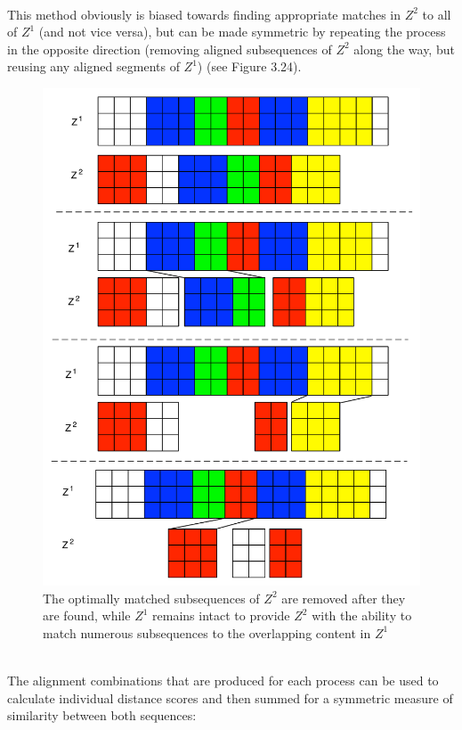 \documentclass[a4paper,12pt]{report} 	%
\numberwithin{figure}{chapter}
\numberwithin{table}{chapter}
\numberwithin{equation}{chapter}
\begin{document}
\begin{flushleft}
\begin{figure}[h!]
\end{figure}
\\
This method obviously is biased towards finding appropriate matches in $Z^2$ to all of $Z^1$ (and not vice versa), but can be made symmetric by repeating the process in the opposite direction (removing aligned subsequences of $Z^2$ along the way, but reusing any aligned segments of $Z^1$) (see Figure 3.24). 
\begin{figure}[h!]
\begin{center}
\includegraphics[scale=0.65]{GreedyMatching3}
\caption[Asymmetric Greedy Removal After Matching Reverse]{The optimally matched subsequences of $Z^2$ are removed after they are found, while $Z^1$ remains intact to provide $Z^2$ with the ability to match numerous subsequences to the overlapping content in $Z^1$}
\end{center}
\end{figure}
\\
The alignment combinations that are produced for each process can be used to calculate individual distance scores and then summed for a symmetric measure of similarity between both sequences:

\end{flushleft}
\end{document}
